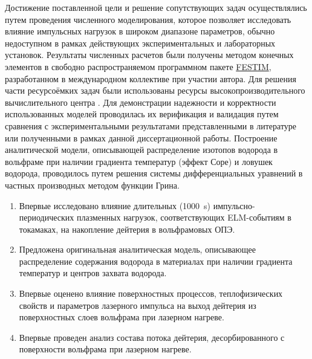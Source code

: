 {\methods} Достижение поставленной цели и решение сопутствующих задач осуществлялись путем проведения численного моделирования, которое позволяет исследовать влияние импульсных нагрузок в широком диапазоне параметров, обычно недоступном в рамках действующих экспериментальных и лабораторных установок. Результаты численных расчетов были получены методом конечных элементов в свободно распространяемом программном пакете \href{https://github.com/festim-dev/FESTIM}{FESTIM}, разработанном в международном коллективе при участии автора. Для решения части ресурсоёмких задач были использованы ресурсы высокопроизводительного вычислительного центра \thesisOrganizationShort. Для демонстрации надежности и корректности использованных моделей проводилась их верификация и валидация путем сравнения с экспериментальными результатами представленными в литературе или полученными в рамках данной диссертационной работы. Построение аналитической модели, описывающей распределение изотопов водорода в вольфраме при наличии градиента температур (эффект Соре) и ловушек водорода, проводилось путем решения системы дифференциальных уравнений в частных производных методом функции Грина.

{\novelty}
\begin{enumerate}[beginpenalty=10000] %
    \item Впервые исследовано влияние длительных (\SI{1000}{\second}) импульсно-периодических плазменных нагрузок, соответствующих ELM-событиям в токамаках,
          на накопление дейтерия в вольфрамовых ОПЭ.
    \item Предложена оригинальная аналитическая модель, описывающее распределение содержания водорода в материалах при наличии градиента температур и центров захвата водорода.
    \item Впервые оценено влияние поверхностных процессов, теплофизических свойств и параметров лазерного импульса на выход дейтерия из поверхностных слоев вольфрама при лазерном нагреве.
    \item Впервые проведен анализ состава потока дейтерия, десорбированного с поверхности вольфрама при лазерном нагреве.
\end{enumerate}

